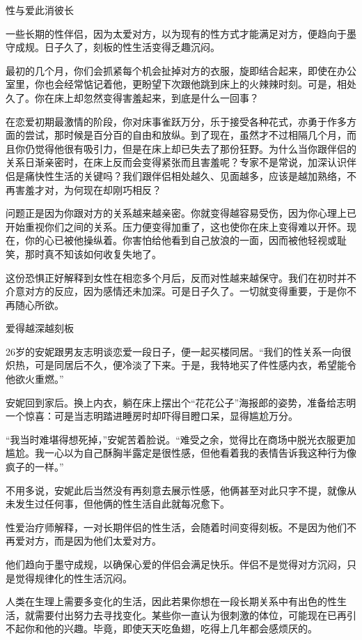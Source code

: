 \documentclass[12pt,UTF8,openany]{ctexbook}
\begin{document}
性与爱此消彼长


一些长期的性伴侣，因为太爱对方，以为现有的性方式才能满足对方，便趋向于墨守成规。日子久了，刻板的性生活变得乏趣沉闷。

最初的几个月，你们会抓紧每个机会扯掉对方的衣服，旋即结合起来，即使在办公室里，你也会经常惦记着他，更盼望下次跟他跳到床上的火辣辣时刻。可是，相处久了。你在床上却忽然变得害羞起来，到底是什么一回事？

在恋爱初期最激情的阶段，你对床事雀跃万分，乐于接受各种花式，亦勇于作多方面的尝试，那时候是百分百的自由和放纵。到了现在，虽然才不过相隔几个月，而且你仍觉得他很有吸引力，但是在床上却已失去了那份狂野。为什么当你跟伴侣的关系日渐亲密时，在床上反而会变得紧张而且害羞呢？专家不是常说，加深认识伴侣是痛快性生活的关键吗？我们跟伴侣相处越久、见面越多，应该是越加熟络，不再害羞才对，为何现在却刚巧相反？

问题正是因为你跟对方的关系越来越亲密。你就变得越容易受伤，因为你心理上已开始重视你们之间的关系。压力便变得加重了，这也使你在床上变得难以开怀。现在，你的心已被他操纵着。你害怕给他看到自己放浪的一面，因而被他轻视或耻笑，那时真不知该如何收复失地了。

这份恐惧正好解释到女性在相恋多个月后，反而对性越来越保守。我们在初时并不介意对方的反应，因为感情还未加深。可是日子久了。一切就变得重要，于是你不再随心所欲。





爱得越深越刻板


26岁的安妮跟男友志明谈恋爱一段日子，便一起买楼同居。“我们的性关系一向很炽热，可是同居后不久，便冷淡了下来。于是，我特地买了件性感内衣，希望能令他欲火重燃。”

安妮回到家后。换上内衣，躺在床上摆出个“花花公子”海报郎的姿势，准备给志明一个惊喜：可是当志明踏进睡房时却吓得目瞪口呆，显得尴尬万分。

“我当时难堪得想死掉，”安妮苦着脸说。“难受之余，觉得比在商场中脱光衣服更加尴尬。我一心以为自己酥胸半露定是很性感，但他看着我的表情告诉我这种行为像疯子的一样。”

不用多说，安妮此后当然没有再刻意去展示性感，他俩甚至对此只字不提，就像从未发生过任何事，但他俩的性生活自此就每况愈下。

性爱治疗师解释，一对长期伴侣的性生活，会随着时间变得刻板。不是因为他们不再爱对方，而是因为他们太爱对方。

他们趋向于墨守成规，以确保心爱的伴侣会满足快乐。伴侣不是觉得对方沉闷，只是觉得规律化的性生活沉闷。

人类在生理上需要多变化的生活，因此若果你想在一段长期关系中有出色的性生活，就需要付出努力去寻找变化。某些你一直认为很刺激的体位，可能现在已再引不起你和他的兴趣。毕竟，即使天天吃鱼翅，吃得上几年都会感烦厌的。
\end{document}
